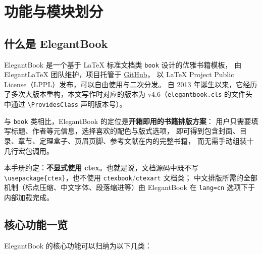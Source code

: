 
\chapter{功能与模块划分}

\section{什么是 ElegantBook}

ElegantBook 是一个基于 LaTeX 标准文档类 \texttt{book} 设计的优雅书籍模板，
由 ElegantLaTeX 团队维护，项目托管于
\href{https://github.com/ElegantLaTeX/ElegantBook}{GitHub}，
以 LaTeX Project Public License（LPPL）发布，可以自由使用与二次分发。
自 2013 年诞生以来，它经历了多次大版本重构，本文写作时对应的版本为
v4.6（\texttt{elegantbook.cls} 的文件头中通过 \verb|\ProvidesClass| 声明版本号）。

与 \texttt{book} 类相比，ElegantBook 的定位是\textbf{开箱即用的书籍排版方案}：
用户只需要填写标题、作者等元信息，选择喜欢的配色与版式选项，
即可得到包含封面、目录、章节、定理盒子、页眉页脚、参考文献在内的完整书籍，
而无需手动组装十几行宏包调用。

\begin{remark}
本手册约定：\textbf{不显式使用 ctex}。也就是说，文档源码中既不写
\verb|\usepackage{ctex}|，也不使用 \texttt{ctexbook}/\texttt{ctexart} 文档类；
中文排版所需的全部机制（标点压缩、中文字体、段落缩进等）由
ElegantBook 在 \texttt{lang=cn} 选项下于内部加载完成。
\end{remark}

\section{核心功能一览}

ElegantBook 的核心功能可以归纳为以下几类：


